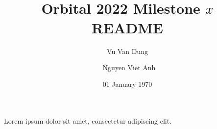 \documentclass[11pt]{article}
\title{\\[1cm]\bfseries Orbital 2022 Milestone $x$ README}
\author{Vu Van Dung \and\ Nguyen Viet Anh}
\date{01 January 1970}
\begin{document}
\maketitle
\tableofcontents
\listoffigures
\setlength\parindent{0pt}
\setlength\parskip{1em}
\begin{markdown}
Lorem ipsum dolor sit amet, consectetur adipiscing elit.
\end{markdown}
\end{document}
